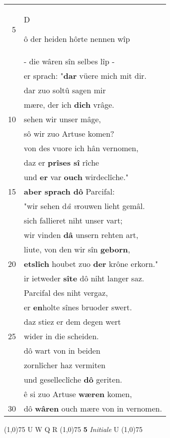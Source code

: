 \documentclass[8pt,a4paper,notitlepage]{article}
\begin{document}
\begin{table}[ht]
\begin{minipage}[t]{0.5\linewidth}
\begin{tabular}{rl}
5 & \begin{large}D\end{large}ô der heiden hôrte nennen wîp\\ 
 & - die wâren sîn selbes lîp -\\ 
 & er sprach: "\textbf{dar} vüere mich mit dir.\\ 
 & dar zuo soltû sagen mir\\ 
 & mære, der ich \textbf{dich} vrâge.\\ 
10 & sehen wir unser mâge,\\ 
 & sô wir zuo Artuse komen?\\ 
 & von des vuore ich hân vernomen,\\ 
 & daz er \textbf{prîses sî} rîche\\ 
 & und \textbf{er} var \textbf{ouch} wirdeclîche."\\ 
15 & \textbf{aber sprach dô} Parcifal:\\ 
 & "wir sehen d\textit{â} \textit{v}rouwen lieht gemâl.\\ 
 & sich fallieret niht unser vart;\\ 
 & wir vinden \textbf{dâ} unsern rehten art,\\ 
 & liute, von den wir sîn \textbf{geborn},\\ 
20 & \textbf{etslîch} houbet zuo \textbf{der} krône erkorn."\\ 
 & ir ietweder \textbf{sîte} dô niht langer saz.\\ 
 & Parcifal des niht vergaz,\\ 
 & er \textbf{en}holte sînes bruoder swert.\\ 
 & daz stiez er dem degen wert\\ 
25 & wider in die scheiden.\\ 
 & dô wart von in beiden\\ 
 & zornlîcher haz vermiten\\ 
 & und geselleclîche \textbf{dô} geriten.\\ 
 & ê si zuo Artuse \textbf{wæren} komen,\\ 
30 & dô \textbf{wâren} ouch mære von in vernomen.\\ 
\end{tabular}
\scriptsize
\line(1,0){75} \newline
U W Q R \newline
\line(1,0){75} \newline
\textbf{5} \textit{Initiale} U  \newline
\line(1,0){75} \newline

\end{minipage}
\end{table}
\end{document}
